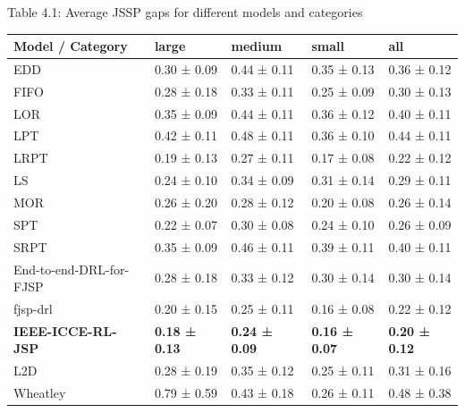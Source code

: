 \begin{table}[H]
    Table 4.1: Average JSSP gaps for different models and categories\\
    \vspace{1mm}
    \small 
    \begin{tabular}{lllll}
        \toprule
        Model / Category & large & medium & small & all \\ 
        \midrule
        EDD & 0.30 ± 0.09 & 0.44 ± 0.11 & 0.35 ± 0.13 & 0.36 ± 0.12 \\
        FIFO & 0.28 ± 0.18 & 0.33 ± 0.11 & 0.25 ± 0.09 & 0.30 ± 0.13  \\
        LOR & 0.35 ± 0.09 & 0.44 ± 0.11 & 0.36 ± 0.12 & 0.40 ± 0.11\\
        LPT & 0.42 ± 0.11 & 0.48 ± 0.11 & 0.36 ± 0.10 & 0.44 ± 0.11\\
        LRPT & 0.19 ± 0.13 & 0.27 ± 0.11 & 0.17 ± 0.08 & 0.22 ± 0.12 \\
        LS & 0.24 ± 0.10 & 0.34 ± 0.09 & 0.31 ± 0.14 & 0.29 ± 0.11 \\
        MOR & 0.26 ± 0.20 & 0.28 ± 0.12 & 0.20 ± 0.08 & 0.26 ± 0.14 \\
        SPT & 0.22 ± 0.07 & 0.30 ± 0.08 & 0.24 ± 0.10 & 0.26 ± 0.09 \\
        SRPT & 0.35 ± 0.09 & 0.46 ± 0.11 & 0.39 ± 0.11 & 0.40 ± 0.11 \\
        End-to-end-DRL-for-FJSP & 0.28 ± 0.18 & 0.33 ± 0.12 & 0.30 ± 0.14 & 0.30 ± 0.14  \\
        fjsp-drl & 0.20 ± 0.15 & 0.25 ± 0.11 & 0.16 ± 0.08 & 0.22 ± 0.12 \\
        \textbf{IEEE-ICCE-RL-JSP} & \textbf{0.18 ± 0.13} & \textbf{0.24 ± 0.09} & \textbf{0.16 ± 0.07} & \textbf{0.20 ± 0.12} \\
        L2D & 0.28 ± 0.19 & 0.35 ± 0.12 & 0.25 ± 0.11 & 0.31 ± 0.16 \\
        Wheatley & 0.79 ± 0.59 & 0.43 ± 0.18 & 0.26 ± 0.11 & 0.48 ± 0.38 \\
        \bottomrule
    \end{tabular}
\end{table}


